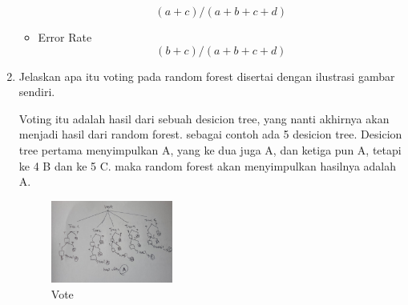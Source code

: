 \begin{enumerate}
\begin{itemize}
\begin{equation}
                    (a+c)/(a+b+c+d)
                \end{equation}
                \item Error Rate
                \begin{equation}
                    (b+c)/(a+b+c+d)
                \end{equation}
            \end{itemize}
        \item Jelaskan apa itu voting pada random forest disertai dengan ilustrasi gambar sendiri. \par
        Voting itu adalah hasil dari sebuah desicion tree, yang nanti akhirnya akan menjadi hasil dari random forest. sebagai contoh ada 5 desicion tree. Desicion tree pertama menyimpulkan A, yang ke dua juga A, dan ketiga pun A, tetapi ke 4 B dan ke 5 C. maka random forest akan menyimpulkan hasilnya adalah A.
        \begin{figure}[H]
            \includegraphics[width=4cm]{figures/1174040/chapter3/vote.jpeg}
            \centering
            \caption{Vote}
        \end{figure}
    \end{enumerate}
